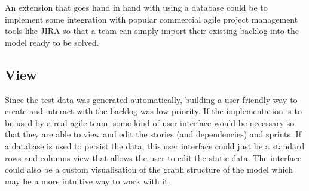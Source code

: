An extension that goes hand in hand with using a database could be to implement some integration with popular commercial agile project management tools like JIRA so that a team can simply import their existing backlog into the model ready to be solved.

\subsection{View}
Since the test data was generated automatically, building a user-friendly way to create and interact with the backlog was low priority. If the implementation is to be used by a real agile team, some kind of user interface would be necessary so that they are able to view and edit the stories (and dependencies) and sprints. If a database is used to persist the data, this user interface could just be a standard rows and columns view that allows the user to edit the static data. The interface could also be a custom visualisation of the graph structure of the model which may be a more intuitive way to work with it.